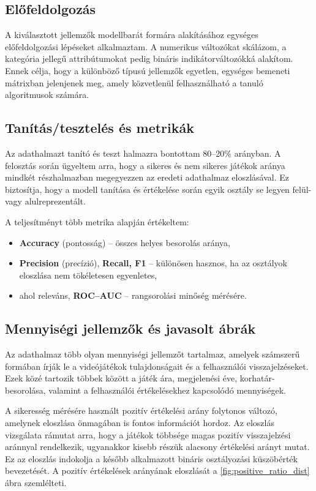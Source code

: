 \subsection{Előfeldolgozás}
A kiválasztott jellemzők modellbarát formára alakításához
egységes előfeldolgozási lépéseket alkalmaztam.
A numerikus változókat skálázom,
a kategória jellegű attribútumokat pedig bináris indikátorváltozókká alakítom.
Ennek célja, hogy a különböző típusú jellemzők egyetlen,
egységes bemeneti mátrixban jelenjenek meg, amely közvetlenül
felhasználható a tanuló algoritmusok számára.

\subsection{Tanítás/tesztelés és metrikák}
Az adathalmazt tanító és teszt halmazra bontottam 80--20\% arányban.
A felosztás során ügyeltem arra, hogy a sikeres és nem sikeres játékok aránya
mindkét részhalmazban megegyezzen az eredeti adathalmaz eloszlásával.
Ez biztosítja, hogy a modell tanítása és értékelése során egyik osztály se legyen
felül- vagy alulreprezentált.

A teljesítményt több metrika alapján értékeltem:

\begin{itemize}
    \item \textbf{Accuracy} (pontosság) \cite{metrics} – összes helyes besorolás aránya,
    \item \textbf{Precision} (precízió), \textbf{Recall, F1} \cite{metrics} – különösen hasznos, ha az osztályok eloszlása nem tökéletesen egyenletes,
    \item ahol releváns, \textbf{ROC--AUC} \cite{roc-auc} – rangsorolási minőség mérésére.
\end{itemize}

\subsection{Mennyiségi jellemzők és javasolt ábrák}

Az adathalmaz több olyan mennyiségi jellemzőt tartalmaz, amelyek számszerű formában írják le a videójátékok tulajdonságait és a felhasználói visszajelzéseket. 
Ezek közé tartozik többek között a játék ára, megjelenési éve, korhatár-besorolása, valamint a felhasználói értékelésekhez kapcsolódó mennyiségek.

A sikeresség mérésére használt pozitív értékelési arány folytonos változó, amelynek eloszlása önmagában is fontos információt hordoz. 
Az eloszlás vizsgálata rámutat arra, hogy a játékok többsége magas pozitív visszajelzési aránnyal rendelkezik, ugyanakkor kisebb részük alacsony értékelési arányt mutat. 
Ez az eloszlás indokolja a később alkalmazott bináris osztályozási küszöbérték bevezetését.
A pozitív értékelések arányának eloszlását a \ref{fig:positive_ratio_dist} ábra szemlélteti.


